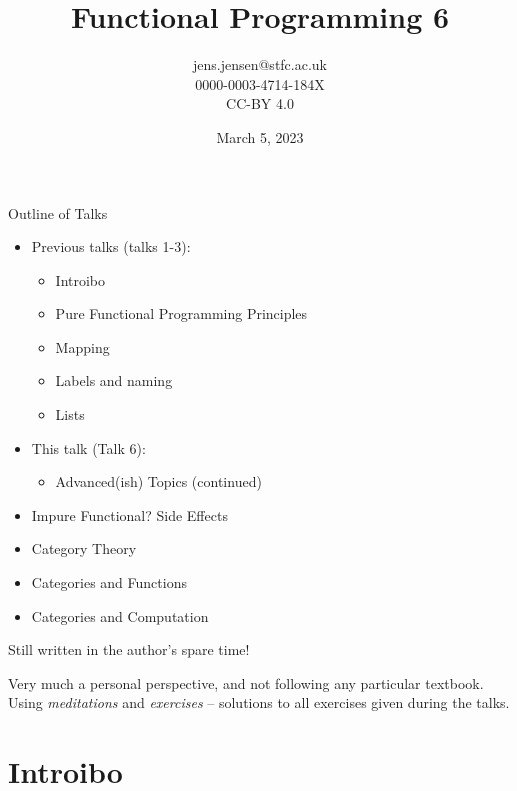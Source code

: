 \documentclass[presentation]{beamer}
\author{jens.jensen@stfc.ac.uk \\0000-0003-4714-184X\\CC-BY 4.0}
\date{March 5, 2023}
\title{Functional Programming 6}
\begin{document}
\maketitle
\begin{frame}{Outline of Talks}

  \begin{itemize}
    \item Previous talks (talks 1-3):
    \begin{itemize}
\item Introibo
\item Pure Functional Programming Principles
    \item Mapping
    \item Labels and naming
    \item Lists
    \end{itemize}
  \item This talk (Talk 6):
    \begin{itemize}
    \item Advanced(ish) Topics (continued)
    \end{itemize}
\item Impure Functional? Side Effects
\item Category Theory
\item Categories and Functions
\item Categories and Computation

  \end{itemize}
Still written in the author's spare time!

\medskip

Very much a personal perspective, and not following any particular textbook.  Using \emph{meditations} and \emph{exercises} -- solutions to all exercises given during the talks.

\end{frame}


\section{Introibo}
\label{sec:org0edb596}
\end{document}

